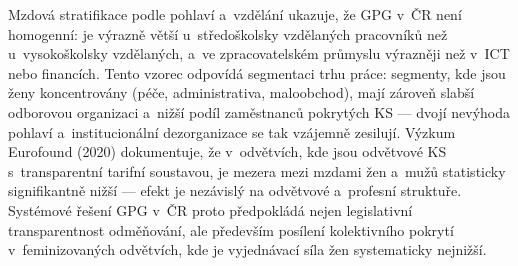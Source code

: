 Mzdová stratifikace podle pohlaví a~vzdělání ukazuje, že \ac{GPG} v~ČR není homogenní: je výrazně větší u~středoškolsky vzdělaných pracovníků než u~vysokoškolsky vzdělaných, a~ve zpracovatelském průmyslu výrazněji než v~ICT nebo financích.
Tento vzorec odpovídá segmentaci trhu práce: segmenty, kde jsou ženy koncentrovány (péče, administrativa, maloobchod), mají zároveň slabší odborovou organizaci a~nižší podíl zaměstnanců pokrytých \ac{KS} --- dvojí nevýhoda pohlaví a~institucionální dezorganizace se tak vzájemně zesilují.
Výzkum Eurofound (2020) dokumentuje, že v~odvětvích, kde jsou odvětvové \ac{KS} s~transparentní tarifní soustavou, je mezera mezi mzdami žen a~mužů statisticky signifikantně nižší --- efekt je nezávislý na odvětvové a~profesní struktuře.
Systémové řešení \ac{GPG} v~ČR proto předpokládá nejen legislativní transparentnost odměňování, ale především posílení kolektivního pokrytí v~feminizovaných odvětvích, kde je vyjednávací síla žen systematicky nejnižší.


